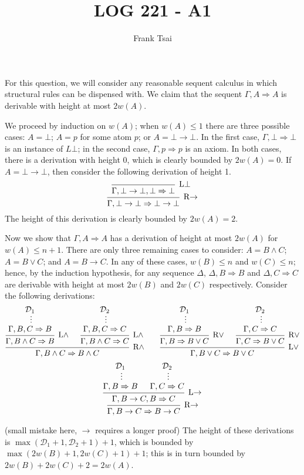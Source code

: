 \documentclass[a4paper]{article}
\title{LOG 221 - A1}
\author{Frank Tsai}
\newcommand{\seqarr}{\Rightarrow}
\newcommand{\cD}{\mathcal{D}}
\begin{document}
\maketitle

\section{}
For this question, we will consider any reasonable sequent calculus in which structural rules can be dispensed with.
We claim that the sequent $\Gamma,A \seqarr A$ is derivable with height at most $2w(A)$.

We proceed by induction on $w(A)$; when $w(A) \leq 1$ there are three possible cases: $A = \bot$; $A = p$ for some atom $p$; or $A = \bot \to \bot$.
In the first case, $\Gamma,\bot \seqarr \bot$ is an instance of $L\bot$; in the second case, $\Gamma,p \seqarr p$ is an axiom.
In both cases, there is a derivation with height $0$, which is clearly bounded by $2w(A) = 0$.
If $A = \bot \to \bot$, then consider the following derivation of height 1.
\[
  \begin{prooftree}
    \infer0[L$\bot$]{\Gamma,\bot \to \bot, \bot \seqarr \bot}
    \infer1[R$\to$]{\Gamma,\bot \to \bot \seqarr \bot \to \bot}
  \end{prooftree}
\]
The height of this derivation is clearly bounded by $2w(A) = 2$.

Now we show that $\Gamma,A \seqarr A$ has a derivation of height at most $2w(A)$ for $w(A) \leq n + 1$.
There are only three remaining cases to consider: $A = B \wedge C$; $A = B \vee C$; and $A = B \to C$.
In any of these cases, $w(B) \leq n$ and $w(C) \leq n$; hence, by the induction hypothesis, for any sequence $\Delta$, $\Delta,B \seqarr B$ and $\Delta,C \seqarr C$ are derivable with height at most $2w(B)$ and $2w(C)$ respectively.
Consider the following derivations:
\[
  \begin{prooftree}
    \hypo{\cD_1}
    \ellipsis{}{\Gamma,B,C \seqarr B}
    \infer1[L$\wedge$]{\Gamma,B \wedge C \seqarr B}
    \hypo{\cD_2}
    \ellipsis{}{\Gamma,B,C \seqarr C}
    \infer1[L$\wedge$]{\Gamma,B \wedge C \seqarr C}
    \infer2[R$\wedge$]{\Gamma,B \wedge C \seqarr B \wedge C}
  \end{prooftree}
  \qquad
  \begin{prooftree}
    \hypo{\cD_1}
    \ellipsis{}{\Gamma,B \seqarr B}
    \infer1[R$\vee$]{\Gamma,B \seqarr B \vee C}
    \hypo{\cD_2}
    \ellipsis{}{\Gamma,C \seqarr C}
    \infer1[R$\vee$]{\Gamma,C \seqarr B \vee C}
    \infer2[L$\vee$]{\Gamma,B \vee C \seqarr B \vee C}
  \end{prooftree}
\]
\[
  \begin{prooftree}
    \hypo{\cD_1}
    \ellipsis{}{\Gamma,B \seqarr B}
    \hypo{\cD_2}
    \ellipsis{}{\Gamma,C \seqarr C}
    \infer2[L$\to$]{\Gamma,B \to C, B \seqarr C}
    \infer1[R$\to$]{\Gamma,B \to C \seqarr B \to C}
  \end{prooftree}
\]

(small mistake here, $\to$ requires a longer proof)
The height of these derivations is $\max(\cD_1 + 1,\cD_2 + 1) + 1$, which is bounded by $\max(2w(B) + 1, 2w(C) + 1) + 1$; this is in turn bounded by $2w(B) + 2w(C) + 2 = 2w(A)$.
\end{document}
